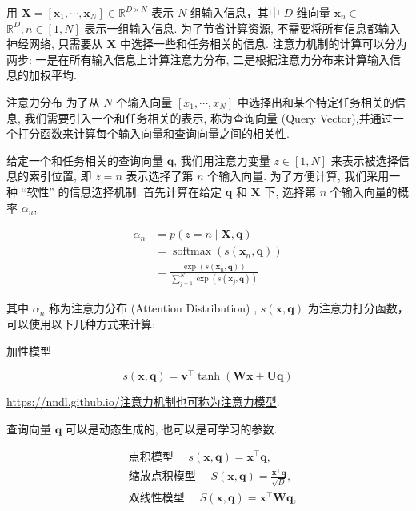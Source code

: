 \documentclass[10pt]{article}
\begin{document}
用 $\boldsymbol{X}=\left[\boldsymbol{x}_{1}, \cdots, \boldsymbol{x}_{N}\right] \in \mathbb{R}^{D \times N}$ 表示 $N$ 组输入信息，其中 $D$ 维向量 $\boldsymbol{x}_{n} \in$ $\mathbb{R}^{D}, n \in[1, N]$ 表示一组输入信息. 为了节省计算资源, 不需要将所有信息都输入神经网络, 只需要从 $\boldsymbol{X}$ 中选择一些和任务相关的信息. 注意力机制的计算可以分为两步: 一是在所有输入信息上计算注意力分布, 二是根据注意力分布来计算输入信息的加权平均.

注意力分布 为了从 $N$ 个输入向量 $\left[x_{1}, \cdots, x_{N}\right]$ 中选择出和某个特定任务相关的信息, 我们需要引入一个和任务相关的表示, 称为查询向量 (Query Vector),并通过一个打分函数来计算每个输入向量和查询向量之间的相关性.

给定一个和任务相关的查询向量 $\boldsymbol{q}$, 我们用注意力变量 $z \in[1, N]$ 来表示被选择信息的索引位置, 即 $z=n$ 表示选择了第 $n$ 个输入向量. 为了方便计算, 我们采用一种 “软性” 的信息选择机制. 首先计算在给定 $\boldsymbol{q}$ 和 $\boldsymbol{X}$ 下, 选择第 $n$ 个输入向量的概率 $\alpha_{n}$,


\begin{align*}
\alpha_{n} & =p(z=n \mid \boldsymbol{X}, \boldsymbol{q}) \\
& =\operatorname{softmax}\left(s\left(\boldsymbol{x}_{n}, \boldsymbol{q}\right)\right) \\
& =\frac{\exp \left(s\left(\boldsymbol{x}_{n}, \boldsymbol{q}\right)\right)}{\sum_{j=1}^{N} \exp \left(s\left(\boldsymbol{x}_{j}, \boldsymbol{q}\right)\right)} \tag{8.1}
\end{align*}


其中 $\alpha_{n}$ 称为注意力分布 (Attention Distribution) , $s(\boldsymbol{x}, \boldsymbol{q})$ 为注意力打分函数，可以使用以下几种方式来计算:

加性模型


\begin{equation*}
s(\boldsymbol{x}, \boldsymbol{q})=\boldsymbol{v}^{\top} \tanh (\boldsymbol{W} \boldsymbol{x}+\boldsymbol{U} \boldsymbol{q}) \tag{8.2}
\end{equation*}


\href{https://nndl.github.io/%E6%B3%A8%E6%84%8F%E5%8A%9B%E6%9C%BA%E5%88%B6%E4%B9%9F%E5%8F%AF%E7%A7%B0%E4%B8%BA%E6%B3%A8%E6%84%8F%E5%8A%9B%E6%A8%A1%E5%9E%8B}{https://nndl.github.io/注意力机制也可称为注意力模型}.

查询向量 $\boldsymbol{q}$ 可以是动态生成的, 也可以是可学习的参数.

$$
\begin{aligned}
& \text { 点积模型 } \quad s(\boldsymbol{x}, \boldsymbol{q})=\boldsymbol{x}^{\top} \boldsymbol{q} \text {, } \\
& \text { 缩放点积模型 } \quad S(\boldsymbol{x}, \boldsymbol{q})=\frac{\boldsymbol{x}^{\top} \boldsymbol{q}}{\sqrt{D}} \text {, } \\
& \text { 双线性模型 } \quad S(\boldsymbol{x}, \boldsymbol{q})=\boldsymbol{x}^{\top} \boldsymbol{W} \boldsymbol{q} \text {, }
\end{aligned}
$$
\end{document}
